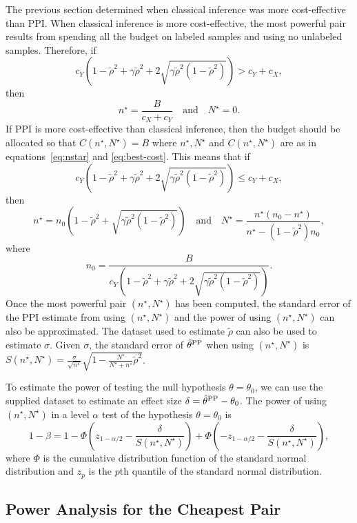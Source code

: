 The previous section determined when classical inference was more cost-effective than PPI. When classical inference is more cost-effective, the most powerful pair results from spending all the budget on labeled samples and using no unlabeled samples. Therefore, if 
\[
    c_Y \left(1-\tilde{\rho}^2 + \gamma\tilde{\rho}^2 +2\sqrt{\gamma \tilde{\rho}^2(1-\tilde{\rho}^2)} \right) > c_Y+c_X,
\] then
\[
    n^\star = \frac{B}{c_X+c_Y}\quad \text{and} \quad N^\star = 0. 
\]
If PPI is more cost-effective than classical inference, then the budget should be allocated so that $C(n^\star, N^\star) = B$ where $n^\star, N^\star$ and $C(n^\star,N^\star)$ are as in equations~\eqref{eq:nstar} and \eqref{eq:best-cost}. This means that if 
\[
    c_Y \left(1-\tilde{\rho}^2 + \gamma\tilde{\rho}^2 +2\sqrt{\gamma \tilde{\rho}^2(1-\tilde{\rho}^2)} \right) \le c_Y+c_X,
\] then 
\[
     n^\star = n_0\left(1-\tilde{\rho}^2+\sqrt{\gamma \tilde{\rho}^2(1-\tilde{\rho}^2)}\right)\quad \text{and} \quad N^\star =   \frac{n^\star(n_0-n^\star)}{n^\star - (1-\tilde{\rho}^2)n_0},
\]
where 
\[
    n_0 = \frac{B}{c_Y\left(1-\tilde{\rho}^2 + \gamma\tilde{\rho}^2 +2\sqrt{\gamma \tilde{\rho}^2(1-\tilde{\rho}^2)} \right)}.
\]
Once the most powerful pair $(n^\star, N^\star)$ has been computed, the standard error of the PPI estimate from using $(n^\star, N^\star)$ and the power of using $(n^\star, N^\star)$ can also be approximated. The dataset used to estimate $\tilde{\rho}$ can also be used to estimate $\sigma$. Given $\sigma$, the standard error of $\hat{\theta}^{\mathrm{PP}}$ when using $(n^\star, N^\star)$ is
$S(n^\star,N^\star) = \frac{\sigma}{\sqrt{n^\star}}\sqrt{1-\frac{N^\star}{N^\star+n^\star}\tilde{\rho}^2}$. 

To estimate the power of testing the null hypothesis $\theta = \theta_0$, we can use the supplied dataset to estimate an effect size $\delta = \hat{\theta}^{\mathrm{PP}}-\theta_0$. The power of using $(n^\star, N^\star)$ in a level $\alpha$ test of the hypothesis $\theta = \theta_0$ is 
\begin{equation}\label{eq:power}
1-\beta = 1 - \Phi\left(z_{1-\alpha/2} - \frac{\delta}{S(n^\star,N^\star)}\right) + \Phi\left(-z_{1-\alpha/2}-\frac{\delta}{S(n^\star,N^\star)}\right),
\end{equation}
where $\Phi$ is the cumulative distribution function of the standard normal distribution and $z_{p}$ is the $p$th quantile of the standard normal distribution.

\subsection{Power Analysis for the Cheapest Pair}\label{sec:cheapest-pair}

